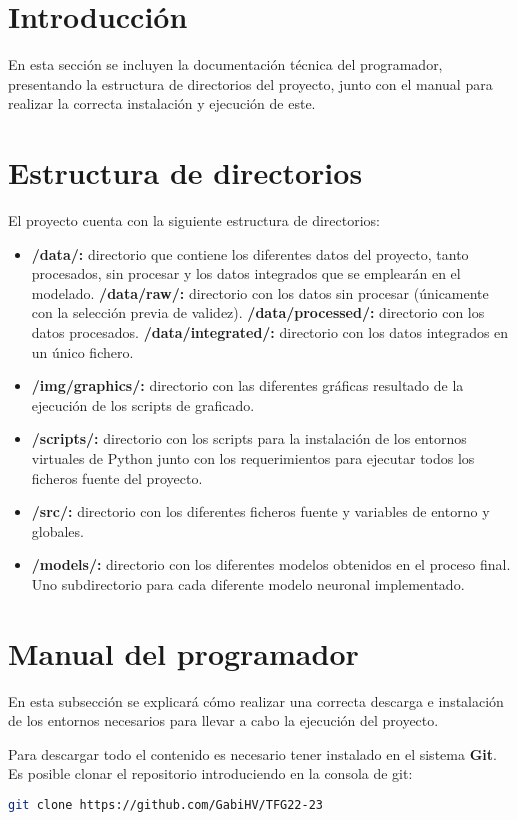 
\section{Introducción}
En esta sección se incluyen la documentación técnica del programador, presentando la estructura de directorios del proyecto, junto con el manual para realizar la correcta 
instalación y ejecución de este. 

\section{Estructura de directorios}
El proyecto cuenta con la siguiente estructura de directorios:
\begin{itemize}
    \item \textbf{/data/:} directorio que contiene los diferentes datos del proyecto, tanto procesados, sin procesar y los datos integrados que se emplearán en el modelado.
    \subitem \textbf{/data/raw/:} directorio con los datos sin procesar (únicamente con la selección previa de validez).
    \subitem \textbf{/data/processed/:} directorio con los datos procesados.
    \subitem \textbf{/data/integrated/:} directorio con los datos integrados en un único fichero.
    \item \textbf{/img/graphics/:} directorio con las diferentes gráficas resultado de la ejecución de los scripts de graficado.
    \item \textbf{/scripts/:} directorio con los scripts para la instalación de los entornos virtuales de Python junto con los requerimientos para ejecutar todos los ficheros
        fuente del proyecto.
    \item \textbf{/src/:} directorio con los diferentes ficheros fuente y variables de entorno y globales.
    \item \textbf{/models/:} directorio con los diferentes modelos obtenidos en el proceso final. Uno subdirectorio para cada diferente modelo neuronal implementado.
\end{itemize}

\section{Manual del programador}
En esta subsección se explicará cómo realizar una correcta descarga e instalación de los entornos necesarios para llevar a cabo la ejecución del proyecto.

Para descargar todo el contenido es necesario tener instalado en el sistema \textbf{Git}. Es posible clonar el repositorio introduciendo en la consola de 
git: 
\begin{lstlisting}[language=Bash]
    git clone https://github.com/GabiHV/TFG22-23
\end{lstlisting}

